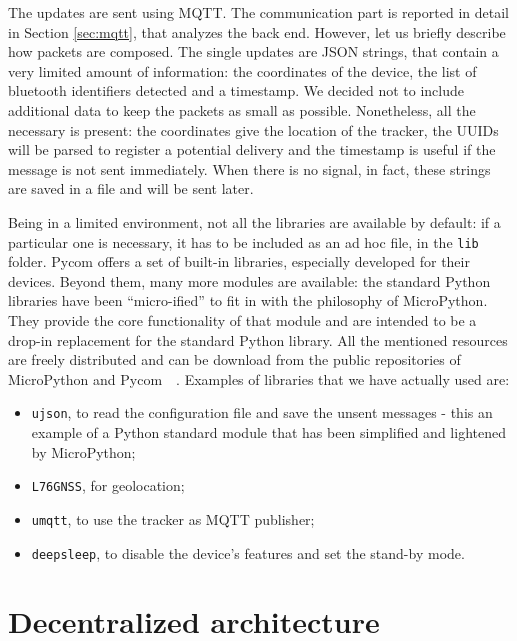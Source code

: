 The updates are sent using MQTT. The communication part is reported in detail in Section \ref{sec:mqtt}, that analyzes the back end. However, let us briefly describe how packets are composed. The single updates are JSON strings, that contain a very limited amount of information: the coordinates of the device, the list of bluetooth identifiers detected and a timestamp. We decided not to include additional data to keep the packets as small as possible. Nonetheless, all the necessary is present: the coordinates give the location of the tracker, the UUIDs will be parsed to register a potential delivery and the timestamp is useful if the message is not sent immediately. When there is no signal, in fact, these strings are saved in a file and will be sent later. 

Being in a limited environment, not all the libraries are available by default: if a particular one is necessary, it has to be included as an ad hoc file, in the \texttt{lib} folder. Pycom offers a set of built-in libraries, especially developed for their devices. Beyond them, many more modules are available: the standard Python libraries have been ``micro-ified'' to fit in with the philosophy of MicroPython. They provide the core functionality of that module and are intended to be a drop-in replacement for the standard Python library. All the mentioned resources are freely distributed and can be download from the public repositories of  MicroPython and Pycom~\cite{micropy_repo}~\cite{pycom_repo}. Examples of libraries that we have actually used are:
\begin{itemize}
    \item \texttt{ujson}, to read the configuration file and save the unsent messages - this an example of a Python standard module that has been simplified and lightened by MicroPython;
    \item \texttt{L76GNSS}, for geolocation;
    \item \texttt{umqtt}, to use the tracker as MQTT publisher;
    \item \texttt{deepsleep}, to disable the device's features and set the stand-by mode.
\end{itemize}

\chapter{Decentralized architecture}
\label{sec:arch}

